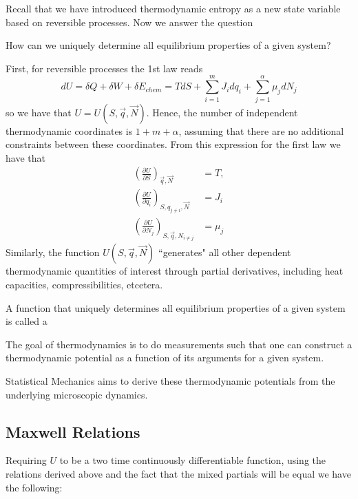 \documentclass[12pt, a4paper, oneside, openright, titlepage]{book}
\begin{document}
Recall that we have introduced thermodynamic entropy as a new state variable based on reversible processes. Now we answer the question 
\begin{qst}
    How can we uniquely determine all equilibrium properties of a given system?
\end{qst}
First, for reversible processes the 1st law reads \begin{equation*}
    dU = \delta Q + \delta W + \delta E_{chem} = TdS + \sum_{i=1}^mJ_idq_i + \sum_{j=1}^{\alpha}\mu_jdN_j
\end{equation*}
so we have that $U = U(S,\vec{q},\vec{N})$. Hence, the number of independent thermodynamic coordinates is $1+m+\alpha$, assuming that there are no additional constraints between these coordinates. From this expression for the first law we have that \begin{align*}
    \left(\frac{\partial U}{\partial S}\right)_{\vec{q},\vec{N}} &= T, \\
    \left(\frac{\partial U}{\partial q_i}\right)_{S,q_{j\neq i},\vec{N}} &= J_i \\
    \left(\frac{\partial U}{\partial N_j}\right)_{S,\vec{q},N_{i\neq j}} &= \mu_j
\end{align*}
Similarly, the function $U(S,\vec{q},\vec{N})$ ``generates" all other dependent thermodynamic quantities of interest through partial derivatives, including heat capacities, compressibilities, etcetera.

\begin{defn}
    A function that uniquely determines all equilibrium properties of a given system is called a 
\end{defn}

\begin{rmk}
    The goal of thermodynamics is to do measurements such that one can construct a thermodynamic potential as a function of its arguments for a given system.
\end{rmk}

Statistical Mechanics aims to derive these thermodynamic potentials from the underlying microscopic dynamics.

\subsection{Maxwell Relations}

Requiring $U$ to be a two time continuously differentiable function, using the relations derived above and the fact that the mixed partials will be equal we have the following:
\end{document}

